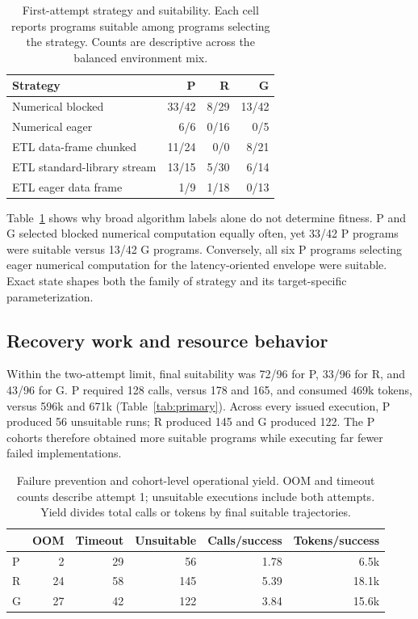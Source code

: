 \documentclass[sigconf,anonymous]{aamas}
\begin{document}
\begin{table}[t]
  \caption{First-attempt strategy and suitability. Each cell reports programs
  suitable among programs selecting the strategy. Counts are
  descriptive across the balanced environment mix.}
  \label{tab:strategy}
  \centering
  \scriptsize
  \begin{tabular}{lrrr}\toprule
  Strategy & P & R & G \\\midrule
  Numerical blocked & 33/42 & 8/29 & 13/42 \\
  Numerical eager & 6/6 & 0/16 & 0/5 \\
  ETL data-frame chunked & 11/24 & 0/0 & 8/21 \\
  ETL standard-library stream & 13/15 & 5/30 & 6/14 \\
  ETL eager data frame & 1/9 & 1/18 & 0/13 \\\bottomrule
  \end{tabular}
\end{table}

Table~\ref{tab:strategy} shows why broad algorithm labels alone do not determine
fitness. P and G selected blocked numerical computation equally often, yet
33/42 P programs were suitable versus 13/42 G programs. Conversely, all six P
programs selecting eager numerical computation for the latency-oriented envelope
were suitable. Exact state shapes both the family of strategy and
its target-specific parameterization.

\subsection{Recovery work and resource behavior}

Within the two-attempt limit, final suitability was 72/96 for P, 33/96 for R,
and 43/96 for G. P required 128 calls, versus 178 and 165, and consumed 469k
tokens, versus 596k and 671k (Table~\ref{tab:primary}). Across every issued
execution, P produced 56 unsuitable runs; R produced 145 and G produced 122.
The P cohorts therefore obtained more suitable programs while executing far
fewer failed implementations.

\begin{table}[t]
  \caption{Failure prevention and cohort-level operational yield. OOM and timeout
  counts describe attempt 1; unsuitable executions include both attempts. Yield
  divides total calls or tokens by final suitable trajectories.}
  \label{tab:operations}
  \centering
  \scriptsize
  \begin{tabular}{lrrrrr}\toprule
  & OOM & Timeout & Unsuitable & Calls/success & Tokens/success \\\midrule
  P & 2 & 29 & 56 & 1.78 & 6.5k \\
  R & 24 & 58 & 145 & 5.39 & 18.1k \\
  G & 27 & 42 & 122 & 3.84 & 15.6k \\\bottomrule
  \end{tabular}
\end{table}
\end{document}
